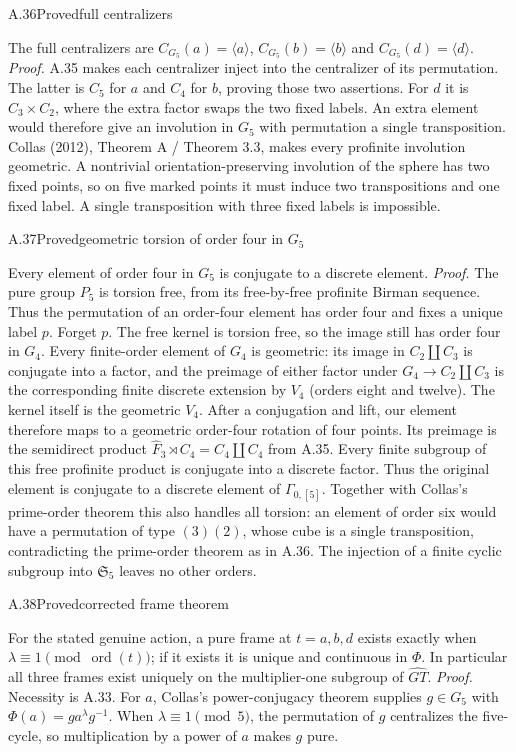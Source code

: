 \begin{statement}{A.36}{Proved}{full centralizers}
\citep[Theorem 3.3]{Collas2012GenusZero}
\end{statement}
The full centralizers are $C_{G_5}(a)=\langle a\rangle$,
$C_{G_5}(b)=\langle b\rangle$ and
$C_{G_5}(d)=\langle d\rangle$.
\emph{Proof.} A.35 makes each centralizer inject into the centralizer of
its permutation. The latter is $C_5$ for $a$ and $C_4$ for $b$, proving
those two assertions. For $d$ it is $C_3\times C_2$, where the extra factor
swaps the two fixed labels. An extra element would therefore give an
involution in $G_5$ with permutation a single transposition. Collas (2012),
Theorem A / Theorem 3.3, makes every profinite involution geometric.
A nontrivial orientation-preserving involution of the sphere has two fixed
points, so on five marked points it must induce two transpositions and one
fixed label. A single transposition with three fixed labels is impossible.

\begin{statement}{A.37}{Proved}{geometric torsion of order four in $G_5$}
\end{statement}
Every element of order four in $G_5$ is conjugate to a discrete element.
\emph{Proof.} The pure group $P_5$ is torsion free, from its free-by-free
profinite Birman sequence. Thus the permutation of an order-four element
has order four and fixes a unique label $p$. Forget $p$. The free kernel is
torsion free, so the image still has order four in $G_4$.
Every finite-order element of $G_4$ is geometric: its image in
$C_2\amalg C_3$ is conjugate into a factor, and the preimage of either
factor under $G_4\to C_2\amalg C_3$ is the corresponding finite discrete
extension by $V_4$ (orders eight and twelve). The kernel itself is the
geometric $V_4$.
After a conjugation and lift, our element therefore maps to a geometric
order-four rotation of four points. Its preimage is the semidirect product
$\widehat F_3\rtimes C_4=C_4\amalg C_4$ from A.35. Every finite subgroup
of this free profinite product is conjugate into a discrete factor. Thus
the original element is conjugate to a discrete element of $\Gamma_{0,[5]}$.
Together with Collas's prime-order theorem this also handles all torsion:
an element of order six would have a permutation of type $(3)(2)$, whose
cube is a single transposition, contradicting the prime-order theorem as
in A.36. The injection of a finite cyclic subgroup into $\mathfrak S_5$
leaves no other orders.

\begin{statement}{A.38}{Proved}{corrected frame theorem}
\end{statement}
For the stated genuine action, a pure frame at $t=a,b,d$ exists exactly
when $\lambda\equiv1\pmod{\operatorname{ord}(t)}$; if it exists it is
unique and continuous in $\Phi$. In particular all three frames exist
uniquely on the multiplier-one subgroup of $\widehat{GT}$.
\emph{Proof.} Necessity is A.33. For $a$, Collas's power-conjugacy theorem
supplies $g\in G_5$ with $\Phi(a)=ga^\lambda g^{-1}$. When
$\lambda\equiv1\pmod5$, the permutation of $g$ centralizes the five-cycle,
so multiplication by a power of $a$ makes $g$ pure.

